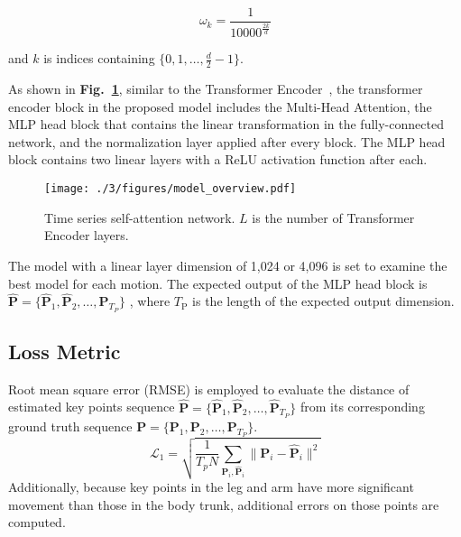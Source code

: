 \begin{equation}\label{eq:3_posenc_weight}
    \omega_{k} = \frac{1}{ 10000^\frac{2k}{d}}
\end{equation}

and  $k$ is indices containing $\{0, 1, \dots, \frac{d}{2} - 1\}$.

As shown in \textbf{Fig.~\ref{fig:modeloverview}},
similar to the Transformer Encoder~\cite{vaswani2017},
the transformer encoder block in the proposed model includes the Multi-Head Attention, the MLP head block that contains the linear transformation in the fully-connected network, and the normalization layer applied after every block.
The MLP head block contains two linear layers with a ReLU activation function after each.
\begin{figure}
    \centering
    \texttt{[image: ./3/figures/model\_overview.pdf]}
    \caption{Time series self-attention network. $L$ is the number of Transformer Encoder layers.}
    \label{fig:modeloverview}
\end{figure} 
The model with a linear layer dimension of 1,024 or 4,096 is set to examine the best model for each motion.
The expected output of the MLP head block is
$\mathbf{\hat{P}} = \{ \mathbf{\hat{P}}_1, \mathbf{\hat{P}}_2, \ldots, \mathbf{\hat{P}}_{T_{P}} \}$
, where $T_\mathrm{P}$ is the length of the expected output dimension.


\subsection{Loss Metric}
Root mean square error (RMSE) is employed to evaluate the distance of estimated key points sequence
$\mathbf{\hat{P}} = \{ \mathbf{\hat{P}}_1, \mathbf{\hat{P}}_2, \ldots, \mathbf{\hat{P}}_{T_{P}} \}$
from its corresponding ground truth sequence
$\mathbf{P} = \{ \mathbf{P}_1, \mathbf{P}_2, \ldots, \mathbf{P}_{T_{P}} \}$.
\begin{equation}
    \label{eq:rmse_all}
    \mathcal{L}_1 =
        \sqrt{
            \frac{1}{T_{p} N}
            \sum_{
                \mathbf{P}_i,
                \mathbf{\hat{P}}_i
            }
            \| \mathbf{P}_i - \mathbf{\hat{P}}_i \|^2
        }
\end{equation}
Additionally, because key points in the leg and arm have more significant movement than those in the body trunk, additional errors on those points are computed.

